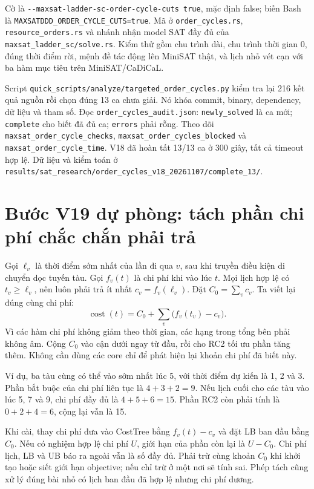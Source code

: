 \documentclass[11pt,a4paper]{article}
\newcommand{\code}[1]{\texttt{#1}}
\newcommand{\file}[1]{\nolinkurl{#1}}
\begin{document}
Cờ là \file{--maxsat-ladder-sc-order-cycle-cuts true}, mặc định false;
biến Bash là \file{MAXSATDDD_ORDER_CYCLE_CUTS=true}.
Mã ở \file{order_cycles.rs}, \file{resource_orders.rs} và nhánh nhận
model SAT đầy đủ của \file{maxsat_ladder_sc/solve.rs}.
Kiểm thử gồm chu trình dài, chu trình thời gian 0, đúng thời điểm rời,
mệnh đề tác động lên MiniSAT thật, và lịch nhỏ vét cạn với ba hàm mục tiêu
trên MiniSAT/CaDiCaL.

Script \file{quick_scripts/analyze/targeted_order_cycles.py} kiểm tra lại
216 kết quả nguồn rồi chọn đúng 13 ca chưa giải. Nó khóa commit, binary,
dependency, dữ liệu và tham số. Đọc \file{order_cycles_audit.json}:
\code{newly\_solved} là ca mới; \code{complete} cho biết đã đủ ca;
\code{errors} phải rỗng. Theo dõi \file{maxsat_order_cycle_checks},
\file{maxsat_order_cycles_blocked} và \file{maxsat_order_cycle_time}.
V18 đã hoàn tất 13/13 ca ở 300 giây, tất cả timeout hợp lệ. Dữ liệu và
kiểm toán ở \file{results/sat_research/order_cycles_v18_20261107/complete_13/}.

\section{Bước V19 dự phòng: tách phần chi phí chắc chắn phải trả}

Gọi $\ell_v$ là thời điểm sớm nhất của lần đi qua $v$, sau khi truyền
điều kiện di chuyển dọc tuyến tàu. Gọi $f_v(t)$ là chi phí khi vào lúc $t$.
Mọi lịch hợp lệ có $t_v\geq\ell_v$, nên luôn phải trả ít nhất
$c_v=f_v(\ell_v)$. Đặt $C_0=\sum_v c_v$. Ta viết lại đúng cùng chi phí:
\[
 \operatorname{cost}(t)=C_0+\sum_v\bigl(f_v(t_v)-c_v\bigr).
\]
Vì các hàm chi phí không giảm theo thời gian, các hạng trong tổng bên
phải không âm. Cộng $C_0$ vào cận dưới ngay từ đầu, rồi cho RC2 tối ưu
phần tăng thêm. Không cần dùng các core chỉ để phát hiện lại khoản chi
phí đã biết này.

Ví dụ, ba tàu cùng có thể vào sớm nhất lúc 5, với thời điểm dự kiến là
1, 2 và 3. Phần bắt buộc của chi phí liên tục là $4+3+2=9$.
Nếu lịch cuối cho các tàu vào lúc 5, 7 và 9, chi phí đầy đủ là
$4+5+6=15$. Phần RC2 còn phải tính là $0+2+4=6$, cộng lại vẫn là 15.

Khi cài, thay chi phí đưa vào CostTree bằng $f_v(t)-c_v$ và đặt LB ban đầu
bằng $C_0$. Nếu có nghiệm hợp lệ chi phí $U$, giới hạn của phần còn lại
là $U-C_0$. Chi phí lịch, LB và UB báo ra ngoài vẫn là số đầy đủ. Phải
trừ cùng khoản $C_0$ khi khởi tạo hoặc siết giới hạn objective; nếu chỉ
trừ ở một nơi sẽ tính sai. Phép tách cũng xử lý đúng bài nhỏ có lịch ban
đầu đã hợp lệ nhưng chi phí dương.
\end{document}
